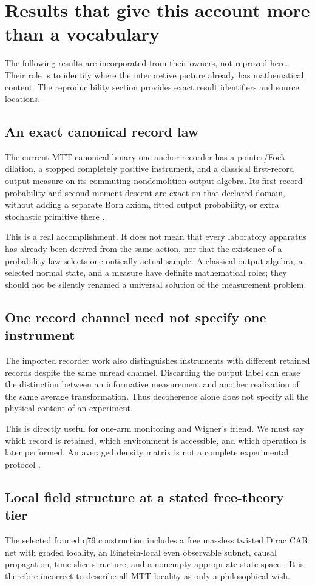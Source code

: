 \documentclass[11pt,a4paper]{article}
\begin{document}
\section{Results that give this account more than a vocabulary}
\label{sec:results}
The following results are incorporated from their owners, not reproved here. Their role is to identify where the interpretive picture already has mathematical content. The reproducibility section provides exact result identifiers and source locations.

\subsection{An exact canonical record law}
The current MTT canonical binary one-anchor recorder has a pointer/Fock dilation, a stopped completely positive instrument, and a classical first-record output measure on its commuting nondemolition output algebra. Its first-record probability and second-moment descent are exact on that declared domain, without adding a separate Born axiom, fitted output probability, or extra stochastic primitive there \cite{NeroQM,NeroResults}.

This is a real accomplishment. It does not mean that every laboratory apparatus has already been derived from the same action, nor that the existence of a probability law selects one ontically actual sample. A classical output algebra, a selected normal state, and a measure have definite mathematical roles; they should not be silently renamed a universal solution of the measurement problem.

\subsection{One record channel need not specify one instrument}
The imported recorder work also distinguishes instruments with different retained records despite the same unread channel. Discarding the output label can erase the distinction between an informative measurement and another realization of the same average transformation. Thus decoherence alone does not specify all the physical content of an experiment.

This is directly useful for one-arm monitoring and Wigner's friend. We must say which record is retained, which environment is accessible, and which operation is later performed. An averaged density matrix is not a complete experimental protocol \cite{NeroMeasurement,NeroResults}.

\subsection{Local field structure at a stated free-theory tier}
The selected framed q79 construction includes a free massless twisted Dirac CAR net with graded locality, an Einstein-local even observable subnet, causal propagation, time-slice structure, and a nonempty appropriate state space \cite{NeroResults}. It is therefore incorrect to describe all MTT locality as only a philosophical wish.
\end{document}
